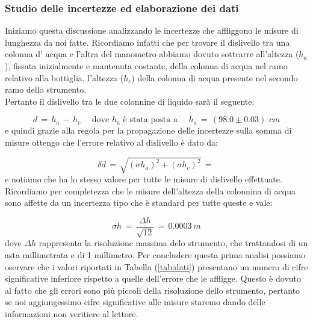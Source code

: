 \subsubsection{Studio delle incertezze ed elaborazione dei dati}

\begin{table}
\end{table}

Iniziamo questa discussione analizzando le incertezze che affliggono le misure di lunghezza da noi fatte. Ricordiamo infatti che per trovare il dislivello tra una colonna d' acqua e l'altra del manometro abbiamo dovuto sottrarre all'altezza ($h_a$), fissata inizialmente e mantenuta costante, della colonna di acqua nel ramo relativo alla bottiglia, l'altezza ($h_c$) della colonna di acqua presente nel secondo ramo dello strumento.\\
Pertanto il dislivello tra le due colonnine di liquido sarà il seguente:

\begin{equation*}
	d \,=\, h_a \,-\, h_c \,\,\quad \text{dove $h_a$ è stata posta a} \quad\,\, h_a \,=\, (98.0 \pm 0.03)\,\,cm 
\end{equation*}
%
e quindi grazie alla regola per la propagazione delle incertezze sulla somma di misure ottengo che l'errore relativo al dislivello è dato da:

\begin{equation*}
	\delta d \,=\, \sqrt{(\sigma h_a)^2+(\sigma h_c)^2} \,=\,
\end{equation*}
%
e notiamo che ha lo stesso valore per tutte le misure di dislivello effettuate. Ricordiamo per completezza che le misure dell'altezza della colonnina di acqua sono affette da un incertezza tipo che è standard per tutte queste e vale:

\begin{equation*}
	\sigma h \,=\, \frac{\Delta h}{\sqrt{12}} \,=\, \SI{0.0003}{m} 
\end{equation*}
%
dove $\Delta h$ rappresenta la risoluzione massima delo strumento, che trattandosi di un asta millimetrata e di 1 millimetro. Per concludere questa prima analisi possiamo oservare che i valori riportati in Tabella (\ref{tab:dati}) presentano un numero di cifre significative inferiore rispetto a quelle dell'errore che le affligge. Questo è dovuto al fatto che gli errori sono più piccoli della risoluzione dello strumento, pertanto se noi aggiungessimo cifre significative alle misure staremo dando delle informazioni non veritiere al lettore.\\

